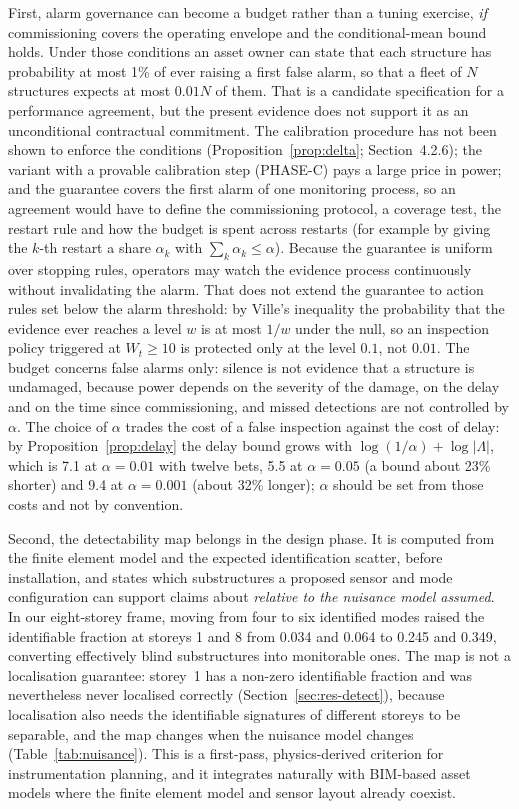 \documentclass[12pt,a4paper]{article}
\newcommand{\rev}[1]{#1}
\newenvironment{revblock}{}{}
\newcommand{\rev}[1]{{\color{revcol}#1}}
\newenvironment{revblock}{\begingroup\color{revcol}}{\endgroup}
\begin{document}
\begin{revblock}
First, alarm governance can become a budget rather than a tuning exercise, \emph{if} commissioning covers the operating envelope and the conditional-mean bound holds. Under those conditions an asset owner can state that each structure has probability at most 1\% of ever raising a first false alarm, so that a fleet of $N$ structures expects at most $0.01N$ of them. That is a candidate specification for a performance agreement, but the present evidence does not support it as an unconditional contractual commitment. The calibration procedure has not been shown to enforce the conditions (Proposition~\ref{prop:delta}; Section~4.2.6); the variant with a provable calibration step (PHASE-C) pays a large price in power; and the guarantee covers the first alarm of one monitoring process, so an agreement would have to define the commissioning protocol, a coverage test, the restart rule and how the budget is spent across restarts (for example by giving the $k$-th restart a share $\alpha_k$ with $\sum_k\alpha_k\le\alpha$). Because the guarantee is uniform over stopping rules, operators may watch the evidence process continuously without invalidating the alarm. That does not extend the guarantee to action rules set below the alarm threshold: by Ville's inequality the probability that the evidence ever reaches a level $w$ is at most $1/w$ under the null, so an inspection policy triggered at $W_t\ge10$ is protected only at the level $0.1$, not $0.01$. The budget concerns false alarms only: silence is not evidence that a structure is undamaged, because power depends on the severity of the damage, on the delay and on the time since commissioning, and missed detections are not controlled by $\alpha$. The choice of $\alpha$ trades the cost of a false inspection against the cost of delay: by Proposition~\ref{prop:delay} the delay bound grows with $\log(1/\alpha)+\log|\Lambda|$, which is 7.1 at $\alpha=0.01$ with twelve bets, 5.5 at $\alpha=0.05$ (a bound about 23\% shorter) and 9.4 at $\alpha=0.001$ (about 32\% longer); $\alpha$ should be set from those costs and not by convention.
\end{revblock}

Second, the detectability map belongs in the design phase. It is computed from the finite element model and the expected identification scatter, before installation, and states which substructures a proposed sensor and mode configuration can support claims about \rev{\emph{relative to the nuisance model assumed}}. In our eight-storey frame, moving from four to six identified modes raised the identifiable fraction at storeys 1 and 8 from 0.034 and 0.064 to 0.245 and 0.349, converting effectively blind substructures into monitorable ones. \rev{The map is not a localisation guarantee: storey~1 has a non-zero identifiable fraction and was nevertheless never localised correctly (Section~\ref{sec:res-detect}), because localisation also needs the identifiable signatures of different storeys to be separable, and the map changes when the nuisance model changes (Table~\ref{tab:nuisance}).} This is a first-pass, physics-derived criterion for instrumentation planning, and it integrates naturally with BIM-based asset models where the finite element model and sensor layout already coexist.
\end{document}

